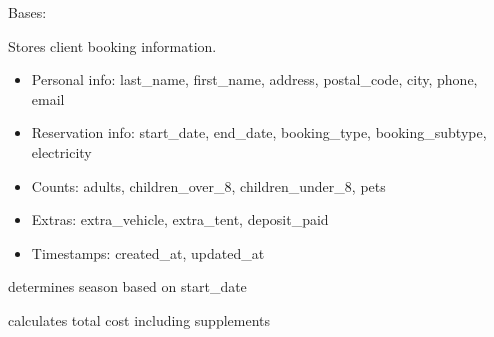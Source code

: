\documentclass[letterpaper,10pt,english]{sphinxmanual}
\begin{document}

\begin{fulllineitems}
\label{\detokenize{index:bookings.models.Booking}}
\pysigstartsignatures
\pysiglinewithargsret
{}
{\sphinxparamcomma {}}
{}
\pysigstopsignatures
\sphinxAtStartPar
Bases: 

\sphinxAtStartPar
Stores client booking information.
\begin{description}
\begin{itemize}
\item {} 
\sphinxAtStartPar
Personal info: last\_name, first\_name, address, postal\_code, city, phone, email

\item {} 
\sphinxAtStartPar
Reservation info: start\_date, end\_date, booking\_type, booking\_subtype, electricity

\item {} 
\sphinxAtStartPar
Counts: adults, children\_over\_8, children\_under\_8, pets

\item {} 
\sphinxAtStartPar
Extras: extra\_vehicle, extra\_tent, deposit\_paid

\item {} 
\sphinxAtStartPar
Timestamps: created\_at, updated\_at

\end{itemize}

\end{description}


\begin{fulllineitems}

\pysigstartsignatures
\pysigline
{}
\pysigstopsignatures
\sphinxAtStartPar
determines season based on start\_date

\end{fulllineitems}



\begin{fulllineitems}

\pysigstartsignatures
\pysigline
{}
\pysigstopsignatures
\sphinxAtStartPar
calculates total cost including supplements


\end{fulllineitems}
\end{fulllineitems}
\end{document}

